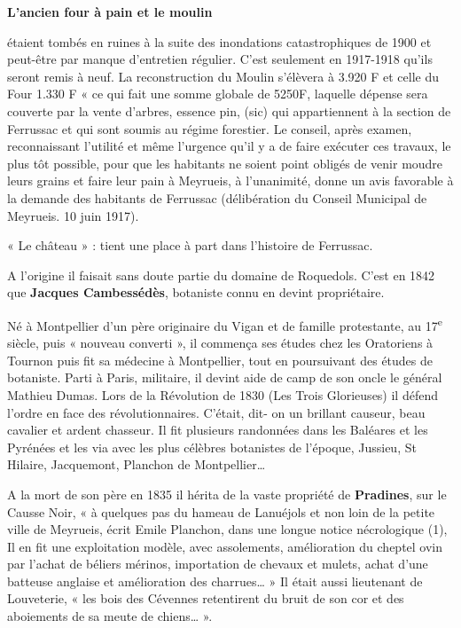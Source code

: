 \textbf{L’ancien four à pain et le moulin}

étaient tombés en ruines à la suite des inondations catastrophiques
de 1900 et peut-être par manque d’entretien régulier. C’est seulement en 1917-1918 qu’ils seront
remis à neuf. La reconstruction du Moulin s’élèvera à 3.920 F et celle du Four 1.330 F
« ce qui fait une somme globale de 5250F, laquelle dépense sera couverte par la vente d’arbres,
essence pin, (sic) qui appartiennent à la section de Ferrussac et qui sont soumis au régime forestier. Le
conseil, après examen, reconnaissant l’utilité et même l’urgence qu’il y a de faire exécuter ces travaux,
le plus tôt possible, pour que les habitants ne soient point obligés de venir moudre leurs grains et faire
leur pain à Meyrueis, à l’unanimité, donne un avis favorable à la demande des habitants de Ferrussac
(délibération du Conseil Municipal de Meyrueis. 10 juin 1917).


« Le château » : tient une place à part dans l’histoire de Ferrussac.

A l’origine il faisait sans doute partie du domaine de Roquedols. C’est en 1842 que
\textbf{Jacques Cambessédès}, botaniste connu en devint propriétaire.

Né à Montpellier d’un père originaire du Vigan et de famille protestante, au 17\textsuperscript{e} siècle, puis « nouveau
converti », il commença ses études chez les Oratoriens à Tournon puis fit sa médecine à Montpellier,
tout en poursuivant des études de botaniste.
Parti à Paris, militaire, il devint aide de camp de son oncle le général Mathieu Dumas. Lors de la
Révolution de 1830 (Les Trois Glorieuses) il défend l’ordre en face des révolutionnaires. C’était, dit-
on un brillant causeur, beau cavalier et ardent chasseur.
Il fit plusieurs randonnées dans les Baléares et les Pyrénées et les via avec les plus célèbres botanistes
de l’époque, Jussieu, St Hilaire, Jacquemont, Planchon de Montpellier…

A la mort de son père en 1835 il hérita de la vaste propriété de \textbf{Pradines}, sur le Causse Noir, « à
quelques pas du hameau de Lanuéjols et non loin de la petite ville de Meyrueis, écrit Emile Planchon,
dans une longue notice nécrologique (1), Il en fit une exploitation modèle, avec assolements,
amélioration du cheptel ovin par l’achat de béliers mérinos, importation de chevaux et mulets, achat
d’une batteuse anglaise et amélioration des charrues… »
Il était aussi lieutenant de Louveterie, « les bois des Cévennes retentirent du bruit de son cor et des
aboiements de sa meute de chiens… ».

